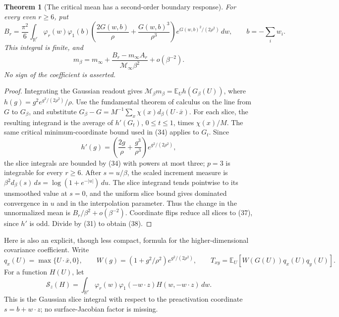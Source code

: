 \documentclass[11pt]{article}
\newtheorem{theorem}{Theorem}\newtheorem{lemma}[theorem]{Lemma}
\newcommand{\E}{\mathbb E}\newcommand{\R}{\mathbb R}
\begin{document}
\begin{theorem}[The critical mean has a second-order boundary response]
For every even $r\ge6$, put
\[
 B_r=\frac{\pi^2}{6}\int_{\R^r}\varphi_r(w)\varphi_1(b)
       \left(\frac{2G(w,b)}\rho+\frac{G(w,b)^3}{\rho^3}\right)
          e^{G(w,b)^2/(2\rho^2)}\,dw,\qquad b=-\sum_iw_i.
                                                               \tag{37}
\]
This integral is finite, and
\[
 m_\beta=m_\infty+
           \frac{B_r-m_\infty A_r}{\mathcal M_\infty\beta^2}
                         +o(\beta^{-2}).                \tag{38}
\]
No sign of the coefficient is asserted.
\end{theorem}
\begin{proof}
Integrating the Gaussian readout gives
$\mathcal M_\beta m_\beta=\E_U h(G_\beta(U))$, where
$h(g)=g^2e^{g^2/(2\rho^2)}/\rho$.
Use the fundamental theorem of calculus on the line from $G$ to
$G_\beta$, and substitute
$G_\beta-G=M^{-1}\sum_x\chi(x)d_\beta(U\cdot\bar x)$.
For each slice, the resulting integrand is the average of $h'(G_t)$,
$0\le t\le1$, times $\chi(x)/M$. The same critical minimum-coordinate
bound used in (34) applies to $G_t$. Since
\[
 h'(g)=\left(\frac{2g}\rho+\frac{g^3}{\rho^3}\right)
                                      e^{g^2/(2\rho^2)},
\]
the slice integrals are bounded by (34) with powers at most three;
$p=3$ is integrable for every $r\ge6$.
After $s=u/\beta$, the scaled increment measure is
$\beta^2d_\beta(s)\,ds=\log(1+e^{-|u|})\,du$.
The slice integrand tends pointwise to its unsmoothed value at $s=0$,
and the uniform slice bound gives dominated convergence in $u$ and
in the interpolation parameter. Thus the change in the unnormalized
mean is $B_r/\beta^2+o(\beta^{-2})$. Coordinate flips reduce all
slices to (37), since $h'$ is odd. Divide by (31) to obtain (38).
\end{proof}

Here is also an explicit, though less compact, formula for the
higher-dimensional covariance coefficient. Write
\[
 q_x(U)=\max\{U\cdot\bar x,0\},\qquad
 W(g)=(1+g^2/\rho^2)e^{g^2/(2\rho^2)},\qquad
 T_{xy}=\E_U[W(G(U))q_x(U)q_y(U)].
\]
For a function $H(U)$, let
\[
 \mathcal S_z(H)=\int_{\R^r}\varphi_r(w)\varphi_1(-w\cdot z)
                                      H(w,-w\cdot z)\,dw.
\]
This is the Gaussian slice integral with respect to the preactivation
coordinate $s=b+w\cdot z$; no surface-Jacobian factor is missing.
\end{document}

